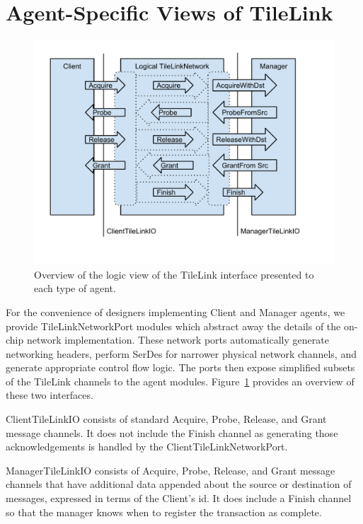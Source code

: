 \section{Agent-Specific Views of TileLink}

\begin{figure}[t!]
\centering
\includegraphics[width=1\columnwidth]{tilelink/figures/agent-specific.pdf}
\caption{Overview of the logic view of the TileLink interface presented to each type of agent.}
\label{fig:agent}
\end{figure}

For the convenience of designers implementing Client and Manager agents, we provide TileLinkNetworkPort modules which abstract away the details of the on-chip network implementation.
These network ports automatically generate networking headers, perform SerDes for narrower physical network channels, and generate appropriate control flow logic.
The ports then expose simplified subsets of the TileLink channels to the agent modules.
Figure~\ref{fig:agent} provides an overview of these two interfaces.

ClientTileLinkIO consists of standard Acquire, Probe, Release, and Grant message channels.
It does not include the Finish channel as generating those acknowledgements is handled by the ClientTileLinkNetworkPort.

ManagerTileLinkIO consists of Acquire, Probe, Release, and Grant message channels that have additional data appended about the source or destination of messages, expressed in terms of the Client's id.
It does include a Finish channel so that the manager knows when to register the transaction as complete.

